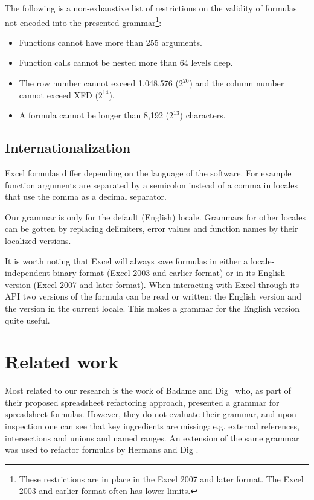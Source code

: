 \documentclass[conference]{IEEEtran}
\begin{document}
The following is a non-exhaustive list of restrictions on the validity of formulas not encoded into the presented grammar\footnote{These restrictions are in place in the Excel 2007 and later format. The Excel 2003 and earlier format often has lower limits.}:

\begin{itemize}
	\item Functions cannot have more than 255 arguments.
	\item Function calls cannot be nested more than 64 levels deep.
	\item The row number cannot exceed 1,048,576 ($2^{20}$) and the column number cannot exceed XFD ($2^{14}$).
	\item A formula cannot be longer than 8,192 ($2^{13}$) characters.
\end{itemize}

\subsection{Internationalization}

Excel formulas differ depending on the language of the software. For example function arguments are separated by a semicolon instead of a comma in locales that use the comma as a decimal separator.

Our grammar is only for the default (English) locale. Grammars for other locales can be gotten by replacing delimiters, error values and function names by their localized versions.

It is worth noting that Excel will always save formulas in either a locale-independent binary format (Excel 2003 and earlier format) or in its English version (Excel 2007 and later format). When interacting with Excel through its API two versions of the formula can be read or written: the English version and the version in the current locale.
This makes a grammar for the English version quite useful.

\section{Related work}
\label{section:relatedWork}
Most related to our research is the work of Badame and Dig~\cite{badame2012refactoring} who, as part of their proposed spreadsheet refactoring approach, presented a grammar for spreadsheet formulas. However, they do not evaluate their grammar, and upon inspection one can see that key ingredients are missing: e.g. external references, intersections and unions and named ranges. An extension of the same grammar was used to refactor formulas by Hermans and Dig \cite{hermans2014bumblebee}.
\end{document}
